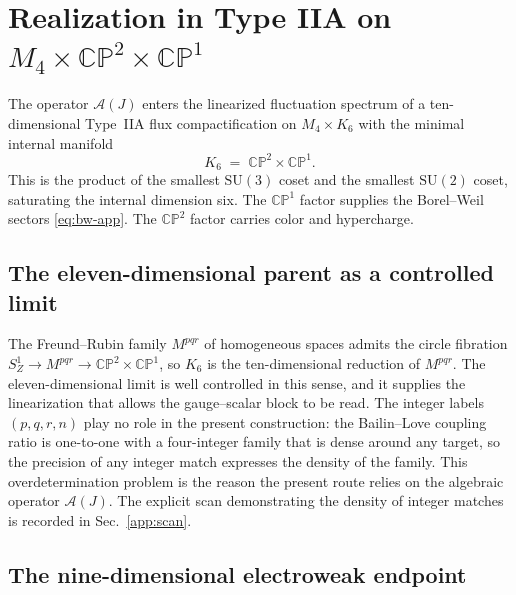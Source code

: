 \documentclass[aps,prd,onecolumn,superscriptaddress,nofootinbib,reprint]{revtex4-2}
\newcommand{\cA}{\mathcal{A}}
\newcommand{\SU}{\mathrm{SU}}
\newcommand{\CP}{\mathbb{CP}}
\begin{document}
\section{Realization in Type IIA on \texorpdfstring{$M_{4}\times\CP^{2}\times\CP^{1}$}{M4 x CP2 x CP1}}
\label{app:realization}

The operator $\cA(J)$ enters the linearized fluctuation spectrum of a
ten-dimensional Type~IIA flux compactification on $M_{4}\times K_{6}$
with the minimal internal manifold
\begin{equation}
  K_{6}\;=\;\CP^{2}\times\CP^{1}.
\label{eq:K6}
\end{equation}
This is the product of the smallest $\SU(3)$ coset and the smallest
$\SU(2)$ coset, saturating the internal dimension six.  The
$\CP^{1}$ factor supplies the Borel--Weil sectors \eqref{eq:bw-app}.
The $\CP^{2}$ factor carries color and hypercharge.

\subsection{The eleven-dimensional parent as a controlled limit}

The Freund--Rubin family $M^{pqr}$ of homogeneous spaces
\cite{BailinLove1984} admits the circle fibration
$S^{1}_{Z}\to M^{pqr}\to\CP^{2}\times\CP^{1}$, so $K_{6}$ is the
ten-dimensional reduction of $M^{pqr}$.  The eleven-dimensional limit
is well controlled in this sense, and it supplies the linearization
that allows the gauge--scalar block to be read.  The integer labels
$(p,q,r,n)$ play no role in the present construction: the
Bailin--Love coupling ratio is one-to-one with a four-integer family
that is dense around any target, so the precision of any integer
match expresses the density of the family.  This
overdetermination problem is the reason the present route relies on
the algebraic operator $\cA(J)$.  The explicit scan demonstrating the
density of integer matches is recorded in Sec.~\ref{app:scan}.

\subsection{The nine-dimensional electroweak endpoint}
\end{document}
